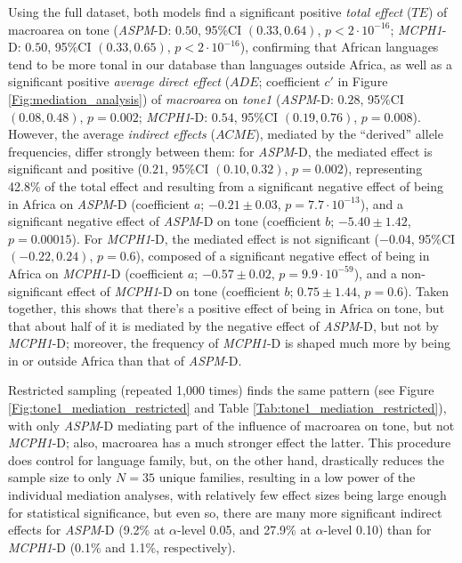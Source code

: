 \documentclass[twoside,onecolumn]{article}
\begin{document}
Using the full dataset, both models find a significant positive \textit{total effect} ($TE$) of macroarea on tone (\textit{ASPM}-D: $0.50$, 95\%CI $(0.33, 0.64)$, $p < 2\cdot10^{-16}$; \textit{MCPH1}-D:  $0.50$, 95\%CI $(0.33, 0.65)$, $p < 2\cdot10^{-16}$), confirming that African languages tend to be more tonal in our database than languages outside Africa, as well as a significant positive \textit{average direct effect} ($ADE$; coefficient $c'$ in Figure \ref{Fig:mediation_analysis}) of \textit{macroarea} on \textit{tone1} (\textit{ASPM}-D: $0.28$, 95\%CI $(0.08, 0.48)$, $p = 0.002$; \textit{MCPH1}-D:  $0.54$, 95\%CI $(0.19, 0.76)$, $p = 0.008$).
However, the average \textit{indirect effects} ($ACME$), mediated by the ``derived'' allele frequencies, differ strongly between them: for \textit{ASPM}-D, the mediated effect is significant and positive ($0.21$, 95\%CI $(0.10, 0.32)$, $p = 0.002$), representing 42.8\% of the total effect and resulting from a significant negative effect of being in Africa on \textit{ASPM}-D (coefficient $a$; $-0.21 \pm0.03$, $p = 7.7\cdot10^{-13}$), and a significant negative effect of \textit{ASPM}-D on tone (coefficient $b$; $-5.40 \pm1.42$, $p = 0.00015$).
For \textit{MCPH1}-D, the mediated effect is not significant ($-0.04$, 95\%CI $(-0.22, 0.24)$, $p = 0.6$), composed of a significant negative effect of being in Africa on \textit{MCPH1}-D (coefficient $a$; $-0.57 \pm0.02$, $p = 9.9\cdot10^{-59}$), and a non-significant effect of \textit{MCPH1}-D on tone (coefficient $b$; $0.75 \pm1.44$, $p = 0.6$).
Taken together, this shows that there's a positive effect of being in Africa on tone, but that about half of it is mediated by the negative effect of \textit{ASPM}-D, but not by \textit{MCPH1}-D; moreover, the frequency of \textit{MCPH1}-D is shaped much more by being in or outside Africa than that of \textit{ASPM}-D.

Restricted sampling (repeated 1,000 times) finds the same pattern (see Figure \ref{Fig:tone1_mediation_restricted} and Table \ref{Tab:tone1_mediation_restricted}), with only \textit{ASPM}-D mediating part of the influence of macroarea on tone, but not \textit{MCPH1}-D; also, macroarea has a much stronger effect the latter.
This procedure does control for language family, but, on the other hand, drastically reduces the sample size to only $N=35$ unique families, resulting in a low power of the individual mediation analyses, with relatively few effect sizes being large enough for statistical significance, but even so, there are many more significant indirect effects for \textit{ASPM}-D (9.2\% at $\alpha$-level 0.05, and 27.9\% at $\alpha$-level 0.10) than for \textit{MCPH1}-D (0.1\% and 1.1\%, respectively).
\end{document}
